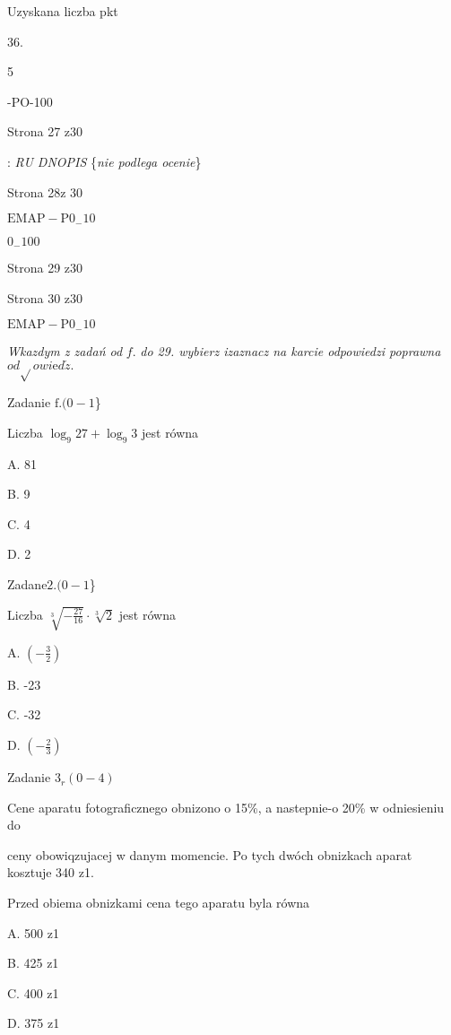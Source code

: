 \documentclass[a4paper,12pt]{article}
\begin{document}
Uzyskana liczba pkt

36.

5

-PO-100

Strona 27 z30





: {\it RU DNOPIS} \{{\it nie podlega ocenie}\}

Strona 28z 30

$\mathrm{E}\mathrm{M}\mathrm{A}\mathrm{P}-\mathrm{P}0_{-}10$





$0_{-}100$

Strona 29 z30





Strona 30 z30

$\mathrm{E}\mathrm{M}\mathrm{A}\mathrm{P}-\mathrm{P}0_{-}10$





{\it Wkazdym z zadań od} $f.$ {\it do 29. wybierz izaznacz na karcie odpowiedzi poprawna} $od\sqrt{}owi\mathrm{e}d\acute{z}.$

Zadanie $\mathrm{f}. (0-1$\}

Liczba $\log_{9}27+\log_{9}3$ jest równa

A. 81

B. 9

C. 4

D. 2

Zadan$\mathrm{e}2. (0-1$\}

Liczba $\sqrt[3]{-\frac{27}{16}}\cdot\sqrt[3]{2}$ jest równa

A. $(-\displaystyle \frac{3}{2})$

B. -23

C. -32

D. $(-\displaystyle \frac{2}{3})$

Zadanie $3_{r}(0-4)$

Cene aparatu fotograficznego obnizono o 15\%, a nastepnie-o 20\% w odniesieniu do

ceny obowiqzujacej w danym momencie. Po tych dwóch obnizkach aparat kosztuje 340 z1.

Przed obiema obnizkami cena tego aparatu byla równa

A. 500 z1

B. 425 z1

C. 400 z1

D. 375 z1
\end{document}
